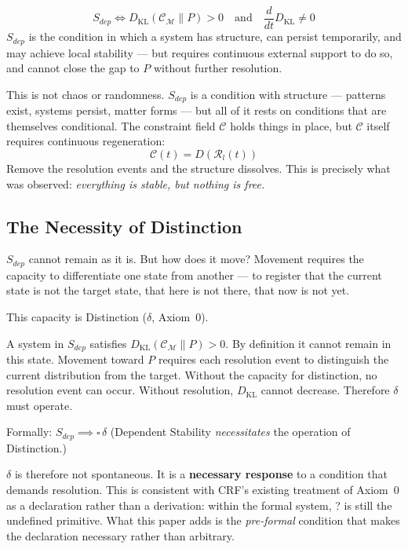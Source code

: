 \documentclass[12pt, a4paper]{article}
\begin{document}
\begin{formalbox}[title={Definition: Dependent Stability ($S_{dep}$)}]
\[
  S_{dep} \iff D_{\mathrm{KL}}(\mathcal{C}_\mathcal{M} \| P) > 0
  \quad\text{and}\quad \frac{d}{dt}D_{\mathrm{KL}} \neq 0
\]
$S_{dep}$ is the condition in which a system has structure, can persist temporarily,
and may achieve local stability --- but requires continuous external support to do so,
and cannot close the gap to $P$ without further resolution.
\end{formalbox}

This is not chaos or randomness. $S_{dep}$ is a condition with structure --- patterns
exist, systems persist, matter forms --- but all of it rests on conditions that are
themselves conditional. The constraint field $\mathcal{C}$ holds things in place,
but $\mathcal{C}$ itself requires continuous regeneration:
\[
  \mathcal{C}(t) = D(\mathcal{R}_l(t))
\]
Remove the resolution events and the structure dissolves. This is precisely what was
observed: \textit{everything is stable, but nothing is free.}

\subsection{The Necessity of Distinction}

$S_{dep}$ cannot remain as it is. But how does it move? Movement requires the capacity
to differentiate one state from another --- to register that the current state is not
the target state, that here is not there, that now is not yet.

This capacity is Distinction ($\delta$, Axiom~0).

\begin{derivedbox}[title={Lemma: $\delta$ is Necessitated by $S_{dep}$}]
A system in $S_{dep}$ satisfies $D_{\mathrm{KL}}(\mathcal{C}_\mathcal{M}\|P) > 0$.
By definition it cannot remain in this state. Movement toward $P$ requires each
resolution event to distinguish the current distribution from the target. Without
the capacity for distinction, no resolution event can occur. Without resolution,
$D_{\mathrm{KL}}$ cannot decrease. Therefore $\delta$ must operate.

Formally: $S_{dep} \implies \square\,\delta$
(Dependent Stability \textit{necessitates} the operation of Distinction.)
\end{derivedbox}

$\delta$ is therefore not spontaneous. It is a \textbf{necessary response} to a
condition that demands resolution. This is consistent with CRF's existing treatment
of Axiom~0 as a declaration rather than a derivation: within the formal system, ?
is still the undefined primitive. What this paper adds is the \textit{pre-formal}
condition that makes the declaration necessary rather than arbitrary.
\end{document}
